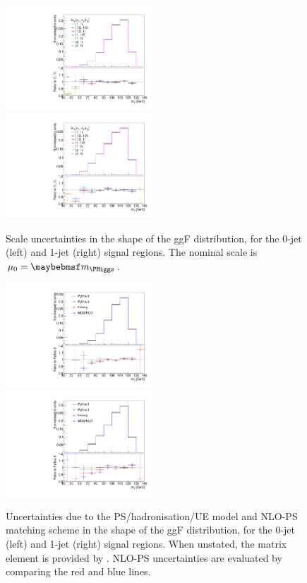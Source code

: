 \begin{figure}
	\includegraphics[width=0.495\textwidth]{tex/signal/mT_0jet_scale}
	\hfill
	\includegraphics[width=0.495\textwidth]{tex/signal/mT_1jet_scale}
	\caption{Scale uncertainties in the shape of the ggF \mt distribution, for the 0-jet 
	(left) and 1-jet (right) signal regions. The nominal scale is $\mu_0 = \mH$.}
	\label{fig:signal:mT_scale}
\end{figure}

\begin{figure}
	\includegraphics[width=0.495\textwidth]{tex/signal/mT_0jet_psue}
	\hfill
	\includegraphics[width=0.495\textwidth]{tex/signal/mT_1jet_psue}
	\caption{Uncertainties due to the PS/hadronisation/UE model and NLO-PS matching scheme
	in the shape of the ggF \mt distribution, for the 0-jet (left) and 1-jet (right) 
	signal regions. When unstated, the matrix element is provided by \powhegbox. 
	NLO-PS uncertainties are evaluated by comparing the red and blue lines.}
	\label{fig:signal:mT_psue}
\end{figure}



